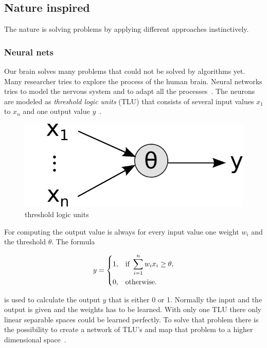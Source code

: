 \subsection{Nature inspired} 
The nature is solving problems by applying different approaches instinctively. 

\subsubsection{Neural nets} 
Our brain solves many problems that could not be solved by algorithms yet. Many researcher tries to explore the process of the human brain. Neural networks tries to model the nervous system and to adapt all the processes~\cite{nn_intro}. The neurons are modeled as \textit{threshold logic units} (TLU) that consists of several input values $x_1$ to $x_n$ and one output value $y$~\cite{ci_kruse}. 


\begin{figure}
\centering
\includegraphics[scale=0.3]{images/tlu.pdf}
\caption{threshold logic units ~\cite{ci_kruse}}
\label{fig:tlu}
\end{figure}


For computing the output value is always for every input value one weight $w_i$ and the threshold $\theta$. The formula 

\begin{equation}
    y = 
\begin{dcases}
    1, & \text{if } \sum_{i=1}^n w_{i} x_{i} \geq \theta \text{,} \\
    0, & \text{otherwise.}
\end{dcases}
\end{equation}

is used to calculate the output $y$ that is either 0 or 1.
Normally the input and the output is given and the weights has to be learned. With only one TLU there only linear separable spaces could be learned perfectly.
To solve that problem there is the possibility to create a network of TLU's and map that problem to a higher dimensional space~\cite{ci_kruse}.




